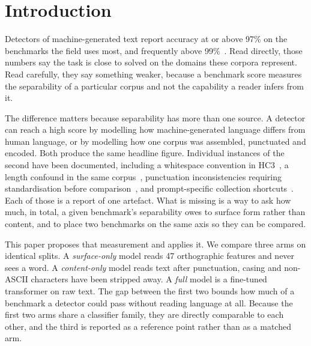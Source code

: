 \section{Introduction}

Detectors of machine-generated text report accuracy at or above 97\% on the benchmarks the field uses most, and frequently above 99\%~\cite{Guo2023close,Su2023plus,Zhou2024exploiting,Ansary2026multirepresentation}. Read directly, those numbers say the task is close to solved on the domains these corpora represent. Read carefully, they say something weaker, because a benchmark score measures the separability of a particular corpus and not the capability a reader infers from it.

The difference matters because separability has more than one source. A detector can reach a high score by modelling how machine-generated language differs from human language, or by modelling how one corpus was assembled, punctuated and encoded. Both produce the same headline figure. Individual instances of the second have been documented, including a whitespace convention in HC3~\cite{Tian2023multiscale}, a length confound in the same corpus~\cite{Baidya2026detecting}, punctuation inconsistencies requiring standardisation before comparison~\cite{Ardeshirifar2025comparing}, and prompt-specific collection shortcuts~\cite{Park2024investigating}. Each of those is a report of one artefact. What is missing is a way to ask how much, in total, a given benchmark's separability owes to surface form rather than content, and to place two benchmarks on the same axis so they can be compared.

This paper proposes that measurement and applies it. We compare three arms on identical splits. A \emph{surface-only} model reads 47 orthographic features and never sees a word. A \emph{content-only} model reads text after punctuation, casing and non-ASCII characters have been stripped away. A \emph{full} model is a fine-tuned transformer on raw text. The gap between the first two bounds how much of a benchmark a detector could pass without reading language at all. Because the first two arms share a classifier family, they are directly comparable to each other, and the third is reported as a reference point rather than as a matched arm.

